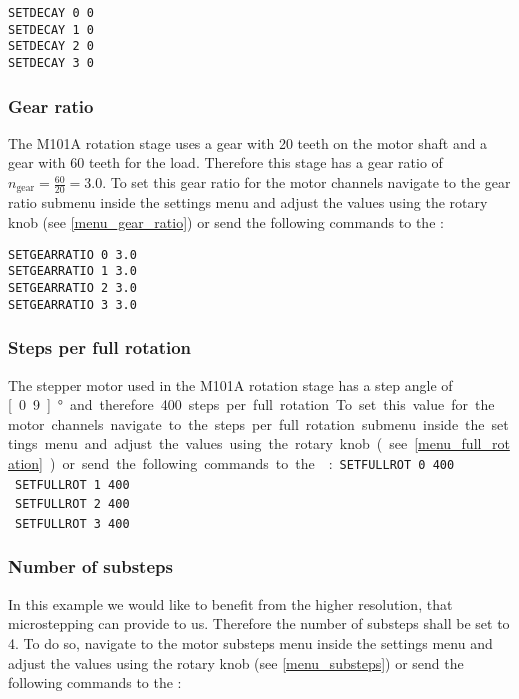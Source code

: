 \texttt{SETDECAY 0 0}\\
\texttt{SETDECAY 1 0}\\
\texttt{SETDECAY 2 0}\\
\texttt{SETDECAY 3 0}

\subsubsection{Gear ratio}
\label{example_gear_ratio}
The M101A rotation stage uses a gear with 20 teeth on the motor shaft and a gear with 60 teeth for the load. Therefore this stage has a gear ratio of $n_{\textrm{gear}} = \frac{60}{20} = 3.0$. To set this gear ratio for the motor channels navigate to the gear ratio submenu inside the settings menu and adjust the values using the rotary knob (see \ref{menu_gear_ratio}) or send the following commands to the \productName :

\texttt{SETGEARRATIO 0 3.0}\\
\texttt{SETGEARRATIO 1 3.0}\\
\texttt{SETGEARRATIO 2 3.0}\\
\texttt{SETGEARRATIO 3 3.0}

\subsubsection{Steps per full rotation}
The stepper motor used in the M101A rotation stage has a step angle of \unit[0.9]{°} and therefore 400 steps per full rotation. To set this value for the motor channels navigate to the steps per full rotation submenu inside the settings menu and adjust the values using the rotary knob (see \ref{menu_full_rotation}) or send the following commands to the \productName :

\texttt{SETFULLROT 0 400}\\
\texttt{SETFULLROT 1 400}\\
\texttt{SETFULLROT 2 400}\\
\texttt{SETFULLROT 3 400}

\subsubsection{Number of substeps}
In this example we would like to benefit from the higher resolution, that microstepping can provide to us. Therefore the number of substeps shall be set to 4. To do so, navigate to the motor substeps menu inside the settings menu and adjust the values using the rotary knob (see \ref{menu_substeps}) or send the following commands to the \productName :

